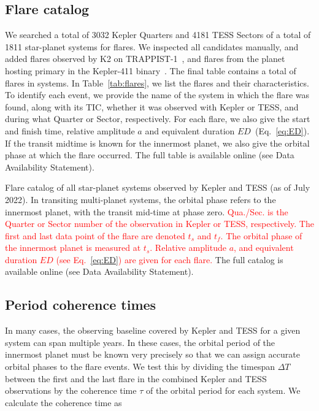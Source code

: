 \documentclass[twocolumn]{aastex631}
\begin{document}
\subsection{Flare catalog}
\label{sec:results:catalog}
We searched a total of 3032 Kepler Quarters and 4181 TESS Sectors of a total of 1811 star-planet systems for flares. We inspected all candidates manually, and added flares observed by K2 on TRAPPIST-1~\citep{paudel2018k2}, and flares from the planet hosting primary in the Kepler-411 binary~\citep{jackman2021stellara}. The final table contains a total of flares in systems. In Table~\ref{tab:flares}, we list the flares and their characteristics. To identify each event, we provide the name of the system in which the flare was found, along with its TIC, whether it was observed with Kepler or TESS, and during what Quarter or Sector, respectively. For each flare, we also give the start and finish time, relative amplitude $a$ and equivalent duration $ED$~(Eq.~\ref{eq:ED}). If the transit midtime is known for the innermost planet, we also give the orbital phase at which the flare occurred. The full table is available online (see Data Availability Statement).

\begin{table*}
    \centering
            \caption{
            Flare catalog of all star-planet systems observed by Kepler and TESS (as of July 2022). In transiting multi-planet systems, the orbital phase refers to the innermost planet, with the transit mid-time at phase zero. \textcolor{red}{Qua./Sec. is the Quarter or Sector number of the observation in Kepler or TESS, respectively. The first and last data point of the flare are denoted $t_s$ and $t_f$. The orbital phase of the innermost planet is measured at $t_s$. Relative amplitude $a$, and equivalent duration $ED$ (see Eq.~\ref{eq:ED}) are given for each flare.} The full catalog is available online (see Data Availability Statement).
        }
    
        \label{tab:flares}
\end{table*}

\subsection{Period coherence times}
\label{sec:results:coherence}
In many cases, the observing baseline covered by Kepler and TESS for a given system can span multiple years. In these cases, the orbital period of the innermost planet must be known very precisely so that we can assign accurate orbital phases to the flare events.
We test this by dividing the timespan $\Delta T$ between the first and the last flare in the combined Kepler and TESS observations by the coherence time $\tau$ of the orbital period for each system. We calculate the coherence time as
\end{document}
